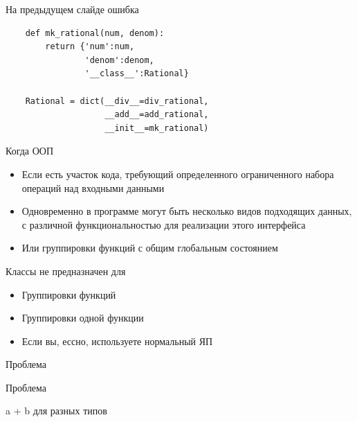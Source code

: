 \documentclass{article}
\begin{document}
\begin{center} На предыдущем слайде ошибка \end{center}
\newpage

\begin{lstlisting}
    def mk_rational(num, denom):
        return {'num':num, 
                'denom':denom, 
                '__class__':Rational}

    Rational = dict(__div__=div_rational,
                    __add__=add_rational,
                    __init__=mk_rational)
\end{lstlisting}
\newpage

\begin{center} Когда ООП \end{center}
\begin{itemize}
    \item Если есть участок кода, требующий определенного ограниченного 
          набора операций над входными данными
    \item Одновременно в программе могут быть несколько видов подходящих данных, 
          с различной функциональностью для реализации этого интерфейса
    \item Или группировки функций с общим глобальным состоянием
\end{itemize}
\newpage

\begin{center} Классы не предназначен для \end{center}
\begin{itemize}
    \item Группировки функций
    \item Группировки одной функции
    \item Если вы, ессно, используете нормальный ЯП
\end{itemize}
\newpage

\begin{center} Проблема \end{center}
\newpage

\begin{center} Проблема \end{center}
a + b для разных типов
\newpage
\end{document}
